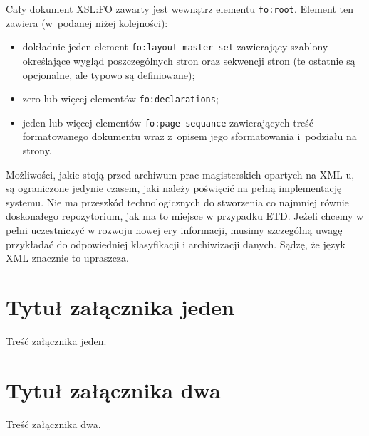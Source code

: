 \documentclass[brudnopis]{xmgr}
\begin{document}
Cały dokument XSL:FO zawarty jest wewnątrz elementu \texttt{fo:root}.
Element ten zawiera (w~podanej niżej kolejności):

\begin{itemize}
\item dokładnie jeden element \texttt{fo:layout-master-set} zawierający
  szablony określające wygląd poszczególnych stron oraz sekwencji
  stron (te ostatnie są opcjonalne, ale typowo są definiowane);
\item zero lub więcej elementów \texttt{fo:declarations};
\item jeden lub więcej elementów \texttt{fo:page-sequance}
 zawierających treść formatowanego dokumentu wraz z~opisem
 jego sformatowania i~podziału na strony.
\end{itemize}

\summary
Możliwości, jakie stoją przed archiwum prac magisterskich opartych na
XML-u, są ograniczone jedynie czasem, jaki należy poświęcić na pełną
implementację systemu. Nie ma przeszkód technologicznych do stworzenia
co najmniej równie doskonałego repozytorium, jak ma to miejsce w
przypadku ETD. Jeżeli chcemy w pełni uczestniczyć w rozwoju nowej ery
informacji, musimy szczególną uwagę przykładać do odpowiedniej
klasyfikacji i archiwizacji danych. Sądzę, że język XML znacznie to
upraszcza.

\appendix
\chapter{Tytuł załącznika jeden}

Treść załącznika jeden.

\chapter{Tytuł załącznika dwa}

Treść załącznika dwa.




\listoftables

\listoffigures

\oswiadczenie
\end{document}
